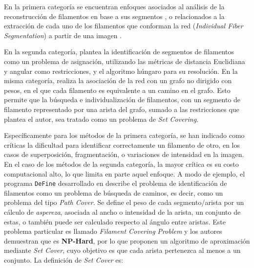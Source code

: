 \documentclass{article}
\begin{document}
\medskip
En la primera categor\'ia se encuentran enfoques asociados al an\'alisis de la reconstrucci\'on de filamentos en base a sus segmentos \cite{zhang2017extracting}, o relacionados a la extracci\'on de cada uno de los filamentos que conforman la red (\textit{Individual Fiber Segmentation}) a partir de una imagen \cite{doi:10.1021/ma502264c}\cite{boudaoud2014fibriltool}\cite{lichtenstein2003quantitative}\cite{alioscha2016robust}.

En la segunda categor\'ia, \cite{cerda2014geometrical} plantea la identificaci\'on de segmentos de filamentos como un problema de asignaci\'on, utilizando las m\'etricas de distancia Euclidiana y angular como restricciones, y el algoritmo h\'ungaro para su resoluci\'on. En la misma categor\'ia, \cite{breuer2015define} realiza la asociaci\'on de la red con un grafo no dirigido con pesos, en el que cada filamento es equivalente a un camino en el grafo. Esto permite que la b\'usqueda e individualizaci\'on de filamentos, con un segmento de filamento representado por una arista del grafo, sumado a las restricciones que plantea el autor, sea tratado como un problema de {\it Set Covering}.

\medskip
Espec\'ificamente para los m\'etodos de la primera categor\'ia, se han indicado como cr\'iticas la dificultad para identificar correctamente un filamento de otro, en los casos de  superposici\'on, fragmentaci\'on, o variaciones de intensidad en la imagen.
En el caso de los m\'etodos de la segunda categor\'ia, la mayor cr\'itica es su costo computacional alto, lo que limita en parte aquel enfoque. A modo de ejemplo, el programa \texttt{DeFine} desarrollado en \cite{breuer2015define} describe el problema de identificaci\'on de filamentos como un problema de b\'usqueda de caminos, es decir, como un problema del tipo {\it Path Cover}. Se define el peso de cada segmento/arista por un c\'alculo de {\it aspereza}, asociada al ancho o intensidad de la arista, un conjunto de estas, o tambi\'en puede ser calculado respecto al \'angulo entre aristas.
Este problema particular es llamado {\it Filament Covering Problem} y los autores demuestran que es \textbf{NP-Hard}, por lo que proponen un algoritmo de aproximaci\'on mediante \textit{Set Cover}, cuyo objetivo es que cada arista pertenezca al menos a un conjunto. La definici\'on de {\it Set Cover} es:
\end{document}
